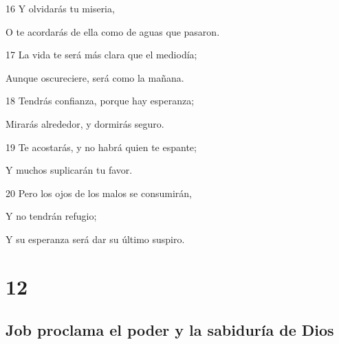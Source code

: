 \par 16 Y olvidarás tu miseria,
\par O te acordarás de ella como de aguas que pasaron.
\par 17 La vida te será más clara que el mediodía;
\par Aunque oscureciere, será como la mañana.
\par 18 Tendrás confianza, porque hay esperanza;
\par Mirarás alrededor, y dormirás seguro.
\par 19 Te acostarás, y no habrá quien te espante;
\par Y muchos suplicarán tu favor.
\par 20 Pero los ojos de los malos se consumirán,
\par Y no tendrán refugio; 
\par Y su esperanza será dar su último suspiro.

\chapter{12}

\section*{Job proclama el poder y la sabiduría de Dios}

